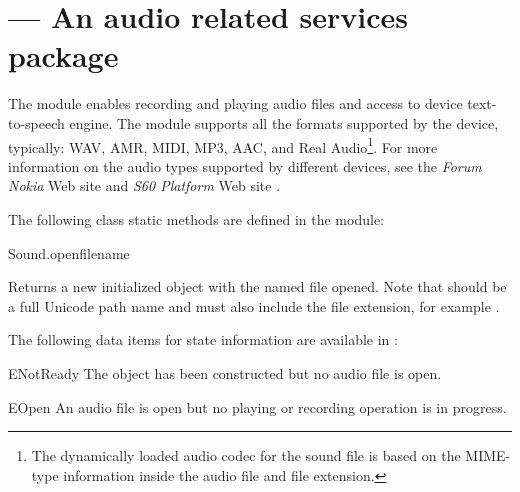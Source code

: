 %
%
%

\section{ ---
  An audio related services package}
\label{sec:audio}


The  module enables recording and playing audio files and access 
to device text-to-speech engine. The  module supports all the 
formats supported by the device, typically: WAV, AMR, MIDI, MP3, AAC, and Real 
Audio\footnote{The dynamically loaded audio codec for the sound file is based on 
the MIME-type information inside the audio file and file extension.}. For more 
information on the audio types supported by different devices, see the 
\textit{Forum Nokia} Web site \cite{S60AudioVideo} and \textit{S60 Platform} Web 
site \cite{S60Developers}. 

The following  class static methods are defined in the 
 module:

\begin{funcdesc}{Sound.open}{filename}

Returns a new initialized  object with the named file opened. 
Note that  should be a full Unicode path name and 
must also include the file extension, for example .
\end{funcdesc}

The following data items for state information are available in :

\begin{datadesc}{ENotReady}
The  object has been constructed but no audio file is open.
\end{datadesc}

\begin{datadesc}{EOpen} 
An audio file is open but no playing or recording operation is in progress.
\end{datadesc}

